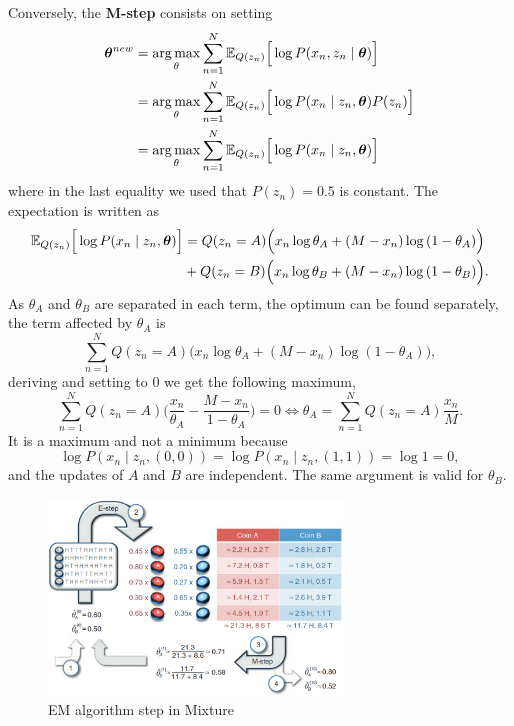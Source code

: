 Conversely, the \textbf{M-step} consists on setting
\[
  \begin{aligned}
    \bm{\theta}^{new} &= \operatorname*{arg\,max}_{\theta} \sum_{n=1}^{N}\mathbb{E}_{Q(z_{n})}\Big[\log P(x_{n}, z_{n} \mid \bm{\theta})\Big]\\
    &= \operatorname*{arg\,max}_{\theta} \sum_{n=1}^{N}\mathbb{E}_{Q(z_{n})}\Big[\log P(x_{n} \mid z_{n}, \bm{\theta})P(z_{n})\Big]\\
    &= \operatorname*{arg\,max}_{\theta} \sum_{n=1}^{N}\mathbb{E}_{Q(z_{n})}\Big[\log P(x_{n} \mid z_{n}, \bm{\theta})\Big]
  \end{aligned}
\]
where in the last equality we used that \(P(z_{n}) = 0.5\) is constant. The expectation is written as
\[
  \begin{aligned}
    \mathbb{E}_{Q(z_{n})}\Big[\log P(x_{n} \mid z_{n}, \bm{\theta})\Big] &= Q(z_{n} = A)\Big( x_{n}\log{\theta_{A}} + (M - x_{n})\log{(1 - \theta_{A})} \Big)\\
    &+ Q(z_{n} = B)\Big( x_{n}\log{\theta_{B}} + (M - x_{n})\log{(1 - \theta_{B})} \Big).
  \end{aligned}
\]
As \(\theta_{A}\) and \(\theta_{B}\) are separated in each term, the optimum can be found separately, the term affected by \(\theta_{A}\) is
\[
  \sum_{n=1}^{N} Q(z_{n}=A) \Big(x_{n}\log{\theta_{A}} + (M - x_{n})\log{(1-\theta_{A})}\Big),
\]
deriving and setting to \(0\) we get the following maximum,
\[
  \sum_{n=1}^{N}Q(z_{n}=A)\Big(\frac{x_{n}}{\theta_{A}} - \frac{M - x_{n}}{1- \theta_{A}}\Big) = 0 \iff \theta_{A} = \sum_{n=1}^{N}Q(z_{n}=A)\frac{x_{n}}{M}.
\]
It is a maximum and not a minimum because
\[
  \log P(x_{n}\mid z_{n},(0,0)) = \log P(x_{n} \mid z_{n}, (1,1)) = \log 1 = 0,
\]
and the updates of \(A\) and \(B\) are independent. The same argument is valid for \(\theta_{B}\).

\begin{figure}
  \centering
  \includegraphics[width=0.7\textwidth]{tex/images/mixture}
  \caption{EM algorithm step in Mixture~\cite{do2008expectation}}\label{fig:mixture}
\end{figure}

